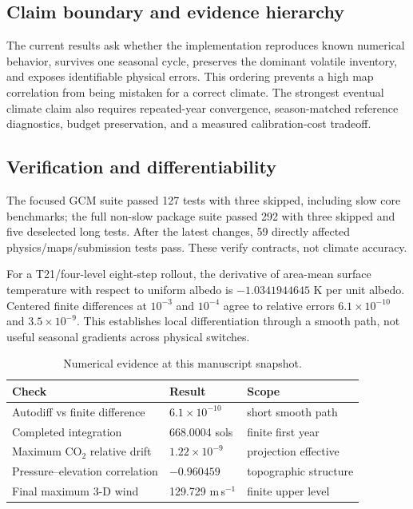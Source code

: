 \documentclass{article}
\begin{document}
\subsection{Claim boundary and evidence hierarchy}
The current results ask whether the implementation reproduces known numerical
behavior, survives one seasonal cycle, preserves the dominant volatile
inventory, and exposes identifiable physical errors. This ordering prevents a
high map correlation from being mistaken for a correct climate. The strongest
eventual climate claim also requires repeated-year convergence, season-matched
reference diagnostics, budget preservation, and a measured calibration-cost
tradeoff.

\subsection{Verification and differentiability}
The focused GCM suite passed 127 tests with three skipped, including slow
core benchmarks; the full non-slow package suite passed 292 with three skipped
and five deselected long tests. After the latest changes, 59 directly affected
physics/maps/submission tests pass. These verify contracts, not climate accuracy.

For a T21/four-level eight-step rollout, the derivative of area-mean surface
temperature with respect to uniform albedo is \(-1.0341944645\) K per unit
albedo. Centered finite differences at \(10^{-3}\) and \(10^{-4}\) agree to
relative errors \(6.1\times10^{-10}\) and \(3.5\times10^{-9}\). This establishes
local differentiation through a smooth path, not useful seasonal gradients
across physical switches.

\begin{table}[t]\centering\small
\caption{Numerical evidence at this manuscript snapshot.}\label{tab:num}
\begin{tabular}{lll}\toprule
Check & Result & Scope\\\midrule
Autodiff vs finite difference & \(6.1\times10^{-10}\) & short smooth path\\
Completed integration & 668.0004 sols & finite first year\\
Maximum CO\(_2\) relative drift & \(1.22\times10^{-9}\) & projection effective\\
Pressure--elevation correlation & \(-0.960459\) & topographic structure\\
Final maximum 3-D wind & 129.729 m\,s\(^{-1}\) & finite upper level\\\bottomrule
\end{tabular}
\end{table}
\end{document}
